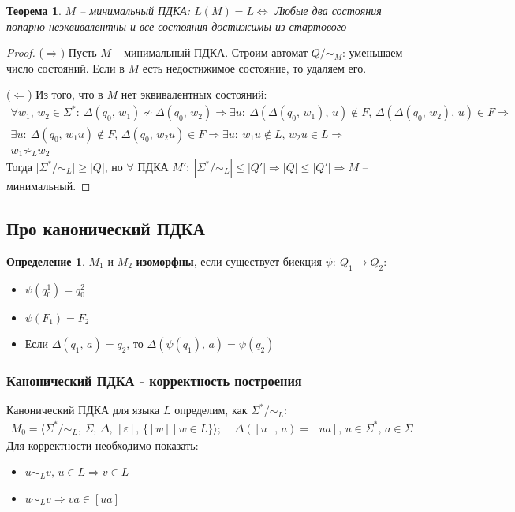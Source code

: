 \documentclass[a4paper,12pt]{article}
\renewcommand{\leq}{\ensuremath{\leqslant}}
\renewcommand{\geq}{\ensuremath{\geqslant}}
\theoremstyle{plain}
\newtheorem{theorem}{Теорема}[subsection]
\theoremstyle{definition}
\newtheorem{definition}{Определение}[subsection]
\theoremstyle{remark}
\begin{document}
\begin{theorem}
	$M$ -- минимальный ПДКА: $L(M) = L \Leftrightarrow$ Любые два состояния попарно неэквивалентны и все состояния достижимы из стартового
\end{theorem}

\begin{proof}
	($\Rightarrow$) Пусть $M$ -- минимальный ПДКА. Строим автомат $Q / \sim_M$: уменьшаем число состояний. Если в $M$ есть недостижимое состояние, то удаляем его.

	($\Leftarrow$) Из того, что в $M$ нет эквивалентных состояний:
	\begin{align*}
		\forall w_1,\, w_2 \in \Sigma^* :\: \Delta(q_0,\, w_1) \not\sim \Delta(q_0,\, w_2) \Rightarrow \exists u :\: \Delta(\Delta(q_0,\, w_1),\, u) \not\in F,\, \Delta(\Delta(q_0,\, w_2),\, u) \in F \Rightarrow \\
		\exists u :\: \Delta(q_0,\, w_1u) \not\in F,\, \Delta(q_0,\, w_2u) \in F \Rightarrow \exists u :\: w_1u \not\in L,\, w_2u \in L \Rightarrow                                                                 \\ w_1 \not\sim_L w_2
	\end{align*}
	Тогда $\vert\Sigma^*/\sim_L\vert \geq \vert Q\vert$, но $\forall$ ПДКА $M' :\: |\Sigma^*/\sim_L| \leq |Q'| \Rightarrow \vert Q\vert \leq \vert Q'\vert \Rightarrow M$ -- минимальный.
\end{proof}

\subsection{Про канонический ПДКА}
\begin{definition}
	$M_1$ и $M_2$ \textbf{изоморфны}, если существует биекция $\psi:\: Q_1 \to Q_2$:
	\begin{itemize}
		\item $\psi(q_0^1) = q_0^2$
		\item $\psi(F_1) = F_2$
		\item Если $\Delta(q_1,\, a) = q_2$, то $\Delta(\psi(q_1),\,a) = \psi(q_2)$
	\end{itemize}
\end{definition}

\subsubsection*{Канонический ПДКА - корректность построения}
Канонический ПДКА для языка $L$ определим, как $\Sigma^* / \sim_L$:
\begin{align*}
	M_0 = \langle\Sigma^*/\sim_L,\,\Sigma,\,\Delta,\, [\varepsilon],\,\{[w] \:|\: w \in L\} \rangle ;\;\;\;\; \Delta([u],\,a) = [ua],\, u \in \Sigma^*,\, a \in \Sigma
\end{align*}
Для корректности необходимо показать:
\begin{itemize}
	\item $u \sim_L v,\, u \in L \Rightarrow v \in L$
	\item $u \sim_L v \Rightarrow va \in [ua]$
\end{itemize}
\end{document}
